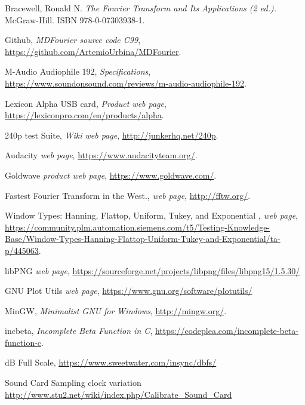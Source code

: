 \documentclass[10pt,a4paper]{report}
\begin{document}
\begin{thebibliography}{9}
	Bracewell, Ronald N. 
	\textit{The Fourier Transform and Its Applications (2 ed.).}
	McGraw-Hill. ISBN 978-0-07303938-1.
	
	Github,
	\textit{MDFourier source code C99},
	\url{https://github.com/ArtemioUrbina/MDFourier}.
	
	M-Audio Audiophile 192,
	\textit{Specifications},
	\url{https://www.soundonsound.com/reviews/m-audio-audiophile-192}.
	
	Lexicon Alpha USB card,
	\textit{Product web page},
	\url{https://lexiconpro.com/en/products/alpha}.
	
	240p test Suite,
	\textit{Wiki web page},
	\url{http://junkerhq.net/240p}.
	
	Audacity
	\textit{web page},
	\url{https://www.audacityteam.org/}.
	
	Goldwave
	\textit{product web page},
	\url{https://www.goldwave.com/}.
	
	Fastest Fourier Transform in the West.,
	\textit{web page},
	\url{http://fftw.org/}.
	
	Window Types: Hanning, Flattop, Uniform, Tukey, and Exponential ,
	\textit{web page},
	\url{https://community.plm.automation.siemens.com/t5/Testing-Knowledge-Base/Window-Types-Hanning-Flattop-Uniform-Tukey-and-Exponential/ta-p/445063}.
	
	libPNG
	\textit{web page},
	\url{https://sourceforge.net/projects/libpng/files/libpng15/1.5.30/}
	
	GNU Plot Utils
	\textit{web page},
	\url{https://www.gnu.org/software/plotutils/}
	
	MinGW, 
	\textit{Minimalist GNU for Windows},
	\url{http://mingw.org/}.
	
	incbeta, 
	\textit{Incomplete Beta Function in C},
	\url{https://codeplea.com/incomplete-beta-function-c}.
	
	dB Full Scale, 
	\url{https://www.sweetwater.com/insync/dbfs/}
	
	Sound Card Sampling clock variation
	\url{http://www.stu2.net/wiki/index.php/Calibrate_Sound_Card}
\end{thebibliography}
\end{document}

